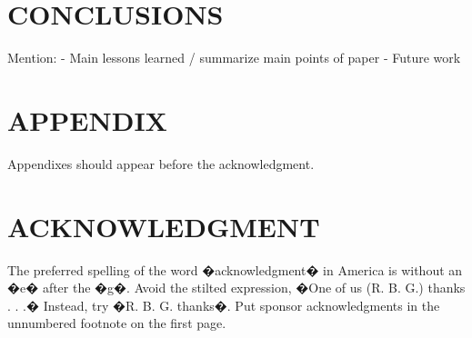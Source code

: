 \documentclass[letterpaper, 10 pt, conference]{ieeeconf}  %
\begin{document}
\section{CONCLUSIONS}
Mention:
  - Main lessons learned / summarize main points of paper
 - Future work
 
 


\addtolength{\textheight}{-12cm}   %







\section*{APPENDIX}

Appendixes should appear before the acknowledgment.

\section*{ACKNOWLEDGMENT}

The preferred spelling of the word �acknowledgment� in America is without an �e� after the �g�. Avoid the stilted expression, �One of us (R. B. G.) thanks . . .�  Instead, try �R. B. G. thanks�. Put sponsor acknowledgments in the unnumbered footnote on the first page.




\end{document}
